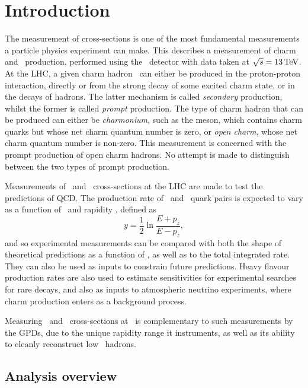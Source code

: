 \chapter{Introduction}
\label{chap:prod:introduction}

The measurement of cross-sections is one of the most fundamental measurements a 
particle physics experiment can make.
This  describes a measurement of charm and \ccbar\ 
production, performed using the \lhcb\ detector with data taken at $\sqrts = 
\SI{13}{\TeV}$.
At the \ac{LHC}, a given charm hadron \PHc\ can either be produced in the proton-proton interaction, directly or from the strong decay of some excited charm state, or in the decays of \PB hadrons.
The latter mechanism is called \emph{secondary} production, whilst the former is called \emph{prompt} production.
The type of charm hadron that can be produced can either be \emph{charmonium}, such as the \PJpsi meson, which contains charm quarks but whose net charm quantum number is zero, or \emph{open charm}, whose net charm quantum number is non-zero.
This measurement is concerned with the prompt production of open charm hadrons.
No attempt is made to distinguish between the two types of prompt production.

Measurements of \ccbar\ and \bbbar\ cross-sections at the \ac{LHC} are made to 
test the predictions of \ac{QCD}.
The production rate of \ccbar\ and \bbbar\ quark pairs is expected to vary as a 
function of \pT\ and rapidity \rapidity, defined as
\begin{equation}
  y = \frac{1}{2}\ln{\frac{E + p_{z}}{E - p_{z}}},
  \label{eqn:prod:introduction:rapidity}
\end{equation}
and so experimental measurements can be compared with both the shape of 
theoretical predictions as a function of \pTy, as well as to the total 
integrated rate.
They can also be used as inputs to constrain future predictions.
Heavy flavour production rates are also used to estimate sensitivities for experimental searches 
for rare decays, and also as inputs to 
atmospheric neutrino experiments, where charm production enters as a background 
process.

Measuring \ccbar\ and \bbbar\ cross-sections at \lhcb\ is complementary to such 
measurements by the \acp{GPD}, due to the unique rapidity range it instruments, 
as well as its ability to cleanly reconstruct low \pT\ hadrons.

\section{Analysis overview}
\label{chap:prod:introduction:analysis_overview}

